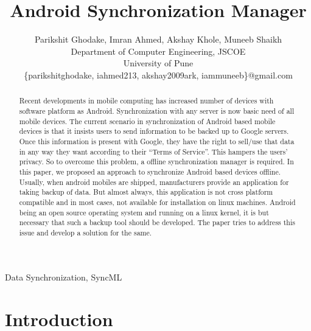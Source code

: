 \documentclass[%
	final,
	notitlepage,
	narroweqnarray,
	inline,
	twoside,
	]{ieee}
\begin{document}
\title{Android Synchronization Manager}

\author{Parikshit Ghodake, Imran Ahmed, Akshay Khole, Muneeb Shaikh \\
Department of Computer Engineering, JSCOE \\
University of Pune\\
\{parikshitghodake, iahmed213, akshay2009ark, iammuneeb\}@gmail.com
}

\maketitle               

\begin{abstract} 
Recent developments in mobile computing has increased number of devices with 
software platform as Android. Synchronization with any server is now basic need of 
all mobile devices.
The current scenario in synchronization of Android based mobile devices is that it 
insists users to send information to be backed up to Google servers. Once this 
information is present with Google, they have the right to sell/use that data in 
any way they want according to their “Terms of Service”. This hampers the users’ 
privacy. So to overcome this problem, a offline synchronization manager is 
required. In this paper, we proposed an approach to synchronize Android based 
devices offline.
Usually, when android mobiles are shipped, manufacturers provide an application for 
taking backup of data. But almost always, this application is not cross platform 
compatible and in most cases, not available for installation on linux machines. 
Android being an open source operating system and running on a linux kernel, it is 
but necessary that such a backup tool should be developed. The paper tries to 
address this issue and develop a solution for the same.
\end{abstract}

\begin{keywords}
Data Synchronization, SyncML
\end{keywords}

\section{Introduction}
\end{document}
